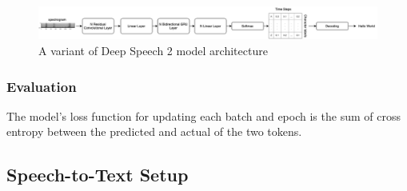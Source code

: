 
\begin{figure}[!t]
    \centering
    \includegraphics[width=\textwidth]{img/speech.png}
    \caption{A variant of Deep Speech 2 model architecture}
    \label{fig:DrQA}
\end{figure}


\subsubsection{Evaluation}

The model's loss function for updating each batch and epoch is the sum of cross entropy between the predicted and actual of the two tokens. 


\subsection{Speech-to-Text Setup}


